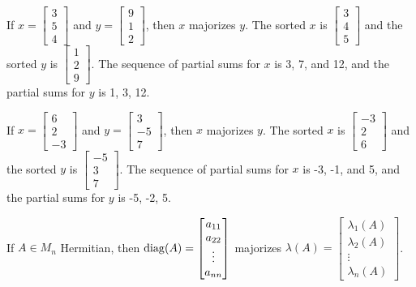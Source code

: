 \begin{example}
If $x = \begin{bmatrix} 3 \\ 5 \\ 4\end{bmatrix}$ and $y = \begin{bmatrix} 9 \\ 1 \\ 2\end{bmatrix}$, then $x$ majorizes $y$. The sorted $x$ is $\begin{bmatrix} 3 \\ 4 \\ 5\end{bmatrix}$ and the sorted $y$ is $\begin{bmatrix} 1 \\ 2 \\ 9\end{bmatrix}$. The sequence of partial sums for $x$ is 3, 7, and 12, and the partial sums for $y$ is 1, 3, 12.
\end{example}

\begin{example}
If $x = \begin{bmatrix} 6 \\ 2 \\ -3\end{bmatrix}$ and $y = \begin{bmatrix} 3 \\ -5 \\ 7\end{bmatrix}$, then $x$ majorizes $y$. The sorted $x$ is $\begin{bmatrix} -3 \\ 2 \\ 6\end{bmatrix}$ and the sorted $y$ is $\begin{bmatrix} -5 \\ 3 \\ 7\end{bmatrix}$. The sequence of partial sums for $x$ is -3, -1, and 5, and the partial sums for $y$ is -5, -2, 5.
\end{example}

\begin{theorem}
\label{thm:diag-majorize-eigs}
If $A \in M_n$ Hermitian, then $\operatorname{diag}(A) = \begin{bmatrix}a_{11} \\ a_{22} \\ \vdots \\ a_{nn}\end{bmatrix}$ majorizes $\lambda(A) = \begin{bmatrix}\lambda_1(A) \\ \lambda_2(A) \\ \vdots \\ \lambda_n(A)\end{bmatrix}$.
\end{theorem}

